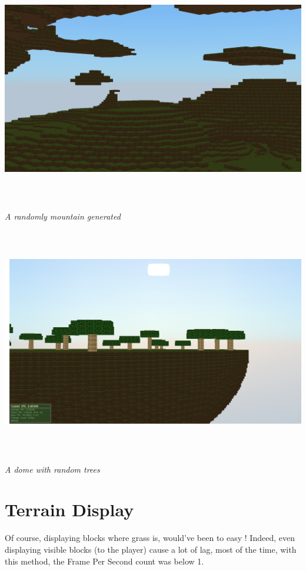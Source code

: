 \documentclass[article]{report} %
\begin{document}
\begin{center}					
\includegraphics[width=16cm, height=10cm]{Images/Screenshots/Mountains02.png}
					\begin{center}\it A randomly mountain generated \end{center}
					\includegraphics[width=16cm, height=10cm]{images/Screenshots/Dome02.png}
					\begin{center}\it A dome with random trees \end{center}
\end{center}

\newpage				
			\section{Terrain Display}
				Of course, displaying blocks where grass is, would've been to easy ! Indeed, even displaying visible blocks (to the player) cause a lot of lag, most of the time, with this method, the Frame Per Second count was below 1. \\
				
\end{document}
